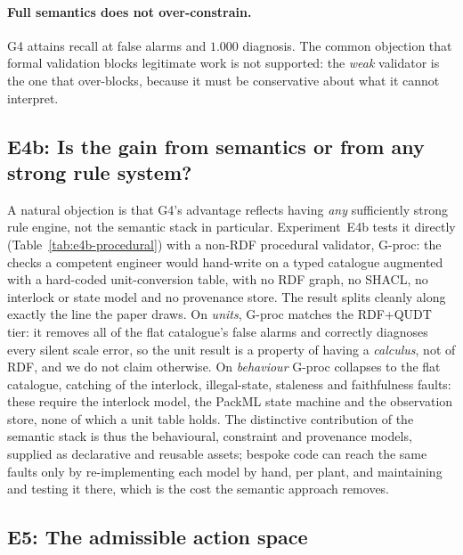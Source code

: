 \paragraph{Full semantics does not over-constrain.} G4 attains
\RecallGFour{} recall at \FPRGFour{} false alarms and $1.000$ diagnosis. The
common objection that formal validation blocks legitimate work is not supported:
the \emph{weak} validator is the one that over-blocks, because it must be
conservative about what it cannot interpret.

\subsection{E4b: Is the gain from semantics or from any strong rule system?}



A natural objection is that G4's advantage reflects having \emph{any} sufficiently
strong rule engine, not the semantic stack in particular. Experiment~E4b tests it
directly (Table~\ref{tab:e4b-procedural}) with a non-RDF procedural validator,
G-proc: the checks a competent engineer would hand-write on a typed catalogue
augmented with a hard-coded unit-conversion table, with no RDF graph, no SHACL, no
interlock or state model and no provenance store. The result splits cleanly along
exactly the line the paper draws. On \emph{units}, G-proc matches the RDF+QUDT
tier: it removes all \GTwoFalseAlarms{} of the flat catalogue's false alarms and
correctly diagnoses every silent scale error, so the unit result is a property of
having a \emph{calculus}, not of RDF, and we do not claim otherwise. On
\emph{behaviour} G-proc collapses to the flat catalogue, catching
\ProcBehavCaught{} of the \ProcBehavN{} interlock, illegal-state, staleness and
faithfulness faults: these require the interlock model, the PackML state machine
and the observation store, none of which a unit table holds. The distinctive
contribution of the semantic stack is thus the behavioural, constraint and
provenance models, supplied as declarative and reusable assets; bespoke code can
reach the same faults only by re-implementing each model by hand, per plant, and
maintaining and testing it there, which is the cost the semantic approach removes.

\subsection{E5: The admissible action space}

